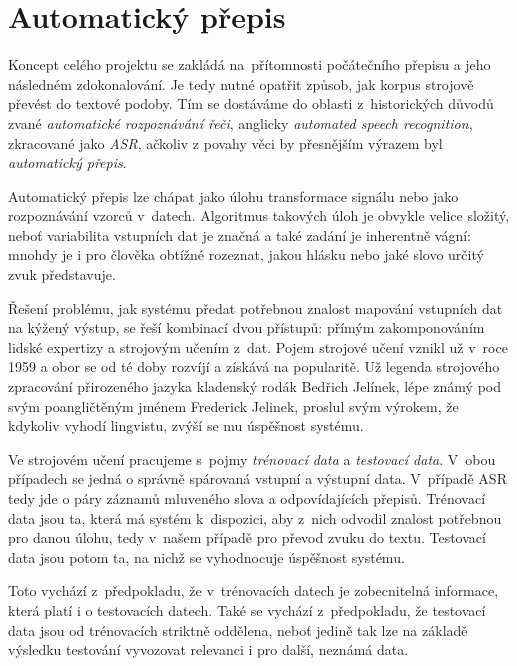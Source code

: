 \chapter{Automatický přepis}
\label{kap:asr}




Koncept celého projektu se zakládá na~přítomnosti počátečního přepisu a jeho
následném zdokonalování.
Je tedy nutné opatřit způsob, jak korpus strojově převést do textové podoby. Tím
se dostáváme do oblasti z~historických důvodů zvané \textit{automatické
rozpoznávání řeči}, anglicky \textit{automated speech recognition}, zkracované
jako \textit{ASR}, ačkoliv z povahy věci by přesnějším výrazem byl
\textit{automatický přepis}.

Automatický přepis lze chápat jako úlohu transformace signálu nebo jako
rozpoznávání vzorců v~datech. Algoritmus takových úloh je obvykle velice
složitý, neboť variabilita vstupních dat je značná a také zadání je inherentně
vágní: mnohdy je i pro člověka obtížné rozeznat, jakou hlásku nebo jaké slovo
určitý zvuk představuje.

Řešení problému, jak systému předat potřebnou znalost mapování vstupních dat na
kýžený výstup, se řeší kombinací dvou přístupů: přímým zakomponováním lidské
expertizy a strojovým učením z~dat. Pojem strojové učení vznikl už v~roce
1959\cite{samuel1959some} a obor se od té doby rozvíjí a získává na popularitě.
Už legenda strojového zpracování přirozeného jazyka kladenský rodák Bedřich
Jelínek, lépe známý pod svým poangličtěným jménem Frederick Jelinek, proslul
svým výrokem, že kdykoliv vyhodí lingvistu, zvýší se mu úspěšnost systému.

Ve strojovém učení pracujeme s~pojmy \textit{trénovací data} a \textit{testovací
data}. V~obou případech se jedná o správně spárovaná vstupní a výstupní data.
V~případě ASR tedy jde o páry záznamů mluveného slova a odpovídajících přepisů.
Trénovací data jsou ta, která má systém k~dispozici, aby z~nich odvodil znalost
potřebnou pro danou úlohu, tedy v~našem případě pro převod zvuku do textu.
Testovací data jsou potom ta, na nichž se vyhodnocuje úspěšnost systému.

Toto vychází z~předpokladu, že v~trénovacích datech je zobecnitelná informace,
která platí i o testovacích datech. Také se vychází z~předpokladu, že testovací
data jsou od trénovacích striktně oddělena, neboť jedině tak lze na základě
výsledku testování vyvozovat relevanci i pro další, neznámá data.

